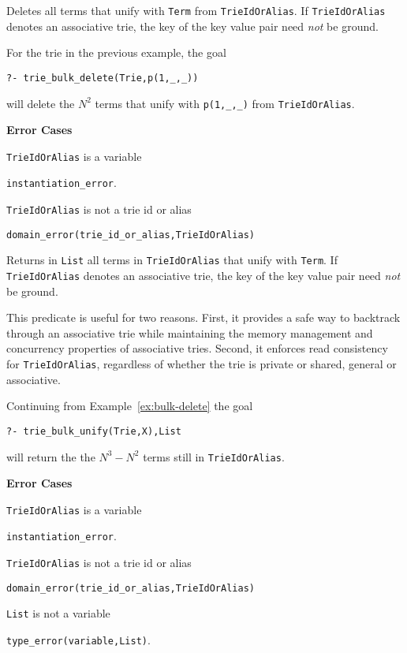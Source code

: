\begin{description}
% 
Deletes all terms that unify with {\tt Term} from {\tt TrieIdOrAlias}.
If {\tt TrieIdOrAlias} denotes an associative trie, the key of the key
value pair need {\em not} be ground.

\begin{example}\label{ex:bulk-delete} \rm
For the trie in the previous example, the goal 
\begin{center}
{\tt ?-  trie\_bulk\_delete(Trie,p(1,\_,\_))} 
\end{center}
will delete the $N^2$ terms that unify with {\tt p(1,\_,\_)} from {\tt TrieIdOrAlias}.
\end{example}

{\bf Error Cases}
\bi
\item 	{\tt TrieIdOrAlias} is a variable
\bi
\item 	{\tt instantiation\_error}.
\ei
\item 	{\tt TrieIdOrAlias} is not a trie id or alias
\bi
\item 	{\tt domain\_error(trie\_id\_or\_alias,TrieIdOrAlias)}
\ei
\ei

% 
Returns in {\tt List} all terms in {\tt TrieIdOrAlias} that unify with
{\tt Term}.  If {\tt TrieIdOrAlias} denotes an associative trie, the
key of the key value pair need {\em not} be ground.

This predicate is useful for two reasons.  First, it provides a safe
way to backtrack through an associative trie while maintaining the
memory management and concurrency properties of associative tries.
Second, it enforces read consistency for {\tt TrieIdOrAlias},
regardless of whether the trie is private or shared, general or
associative.

\begin{example} \rm
Continuing from Example~\ref{ex:bulk-delete} the goal
\begin{center}
{\tt ?-  trie\_bulk\_unify(Trie,X),List} 
\end{center}
will return the the $N^3 - N^2$ terms still in {\tt TrieIdOrAlias}.
\end{example}

{\bf Error Cases}
\bi
\item 	{\tt TrieIdOrAlias} is a variable
\bi
\item 	{\tt instantiation\_error}.
\ei
\item 	{\tt TrieIdOrAlias} is not a trie id or alias
\bi
\item 	{\tt domain\_error(trie\_id\_or\_alias,TrieIdOrAlias)}
\ei
\item 	{\tt List} is not a variable
\bi
\item 	{\tt type\_error(variable,List)}.
\ei
\ei


\end{description}
